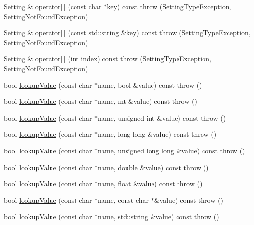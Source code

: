 \begin{DoxyCompactItemize}
\hyperlink{classlibconfig_1_1Setting}{Setting} \& \hyperlink{classlibconfig_1_1Setting_a21d11b7fb846888e0aee832e081b622d}{operator\mbox{[}$\,$\mbox{]}} (const char $\ast$key) const   throw (\-Setting\-Type\-Exception, Setting\-Not\-Found\-Exception)
\item 
\hyperlink{classlibconfig_1_1Setting}{Setting} \& \hyperlink{classlibconfig_1_1Setting_a3a6be387b0a26e992e111230b7d10474}{operator\mbox{[}$\,$\mbox{]}} (const std\-::string \&key) const   throw (\-Setting\-Type\-Exception, Setting\-Not\-Found\-Exception)
\item 
\hyperlink{classlibconfig_1_1Setting}{Setting} \& \hyperlink{classlibconfig_1_1Setting_a389df94c075e8330e4630193e4d2d47b}{operator\mbox{[}$\,$\mbox{]}} (int index) const   throw (\-Setting\-Type\-Exception, Setting\-Not\-Found\-Exception)
\item 
bool \hyperlink{classlibconfig_1_1Setting_a0e4e4c4663d9a783bf4474bad8a50035}{lookup\-Value} (const char $\ast$name, bool \&value) const   throw ()
\item 
bool \hyperlink{classlibconfig_1_1Setting_a9a6031fce4d16a7932723df19f1bfe49}{lookup\-Value} (const char $\ast$name, int \&value) const   throw ()
\item 
bool \hyperlink{classlibconfig_1_1Setting_a8d04a467743202188746488d06556b59}{lookup\-Value} (const char $\ast$name, unsigned int \&value) const   throw ()
\item 
bool \hyperlink{classlibconfig_1_1Setting_ac5cb1a509267aabba8ed01416b8ffeea}{lookup\-Value} (const char $\ast$name, long long \&value) const   throw ()
\item 
bool \hyperlink{classlibconfig_1_1Setting_a7c3373fa2e0a0a42e1df4cf481b1bfb9}{lookup\-Value} (const char $\ast$name, unsigned long long \&value) const   throw ()
\item 
bool \hyperlink{classlibconfig_1_1Setting_ab4f52a99ffeb1653963fb5b18924e3a0}{lookup\-Value} (const char $\ast$name, double \&value) const   throw ()
\item 
bool \hyperlink{classlibconfig_1_1Setting_aedb49259520a78bc3157592c98dcef7a}{lookup\-Value} (const char $\ast$name, float \&value) const   throw ()
\item 
bool \hyperlink{classlibconfig_1_1Setting_a57859386ad6801ae51eb704fd611c432}{lookup\-Value} (const char $\ast$name, const char $\ast$\&value) const   throw ()
\item 
bool \hyperlink{classlibconfig_1_1Setting_ab8ace851b657bbb0231c888ecc8addbd}{lookup\-Value} (const char $\ast$name, std\-::string \&value) const   throw ()

\end{DoxyCompactItemize}
